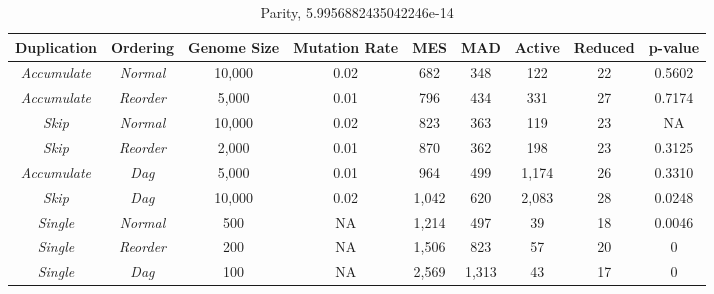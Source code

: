 \documentclass[journal]{IEEEtran}
\begin{document}
\begin{table*}
	\centering
	\begin{tabular}{|c|c|c|c|c|c|c|c|c|}
	  \hline
\textbf{Duplication} & \textbf{Ordering} & \textbf{Genome Size} & \textbf{Mutation Rate} & \textbf{MES} & \textbf{MAD} & \textbf{Active} & \textbf{Reduced} & \textbf{p-value} \\ \hline
\emph{Accumulate} & \emph{Normal} & 10,000 & 0.02 & 682 & 348 & 122 & 22 & 0.5602 \\ \hline
\emph{Accumulate} & \emph{Reorder}&  5,000 & 0.01 & 796 & 434 & 331 & 27 & 0.7174 \\ \hline
\rowcolor{Gray}
\emph{Skip} & \emph{Normal}       & 10,000 & 0.02 & 823 & 363 & 119 & 23 & NA \\ \hline
\emph{Skip} & \emph{Reorder}      &  2,000 & 0.01 & 870 & 362 & 198 & 23 & 0.3125 \\ \hline
\emph{Accumulate} & \emph{Dag}    &  5,000 & 0.01 & 964 & 499 & 1,174 & 26 & 0.3310 \\ \hline
\emph{Skip} & \emph{Dag}          & 10,000 & 0.02 & 1,042 & 620 & 2,083 & 28 & 0.0248 \\ \hline
\emph{Single} & \emph{Normal}     & 500 & NA & 1,214 & 497 & 39 & 18 & 0.0046 \\ \hline
\emph{Single} & \emph{Reorder}    & 200 & NA & 1,506 & 823 & 57 & 20 & 0 \\ \hline
\emph{Single} & \emph{Dag}        & 100 & NA & 2,569 & 1,313 & 43 & 17 & 0 \\ \hline
	\end{tabular}
	\caption{Parity, 5.9956882435042246e-14}
	\label{tab:parity}
\end{table*}
\end{document}
